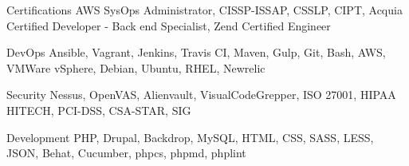 


\begin{cvskills}


\cvskill
{Certifications}
{AWS SysOps Administrator, CISSP-ISSAP, CSSLP, CIPT, Acquia Certified Developer - Back end Specialist, Zend Certified Engineer }

\cvskill
{DevOps}
{Ansible, Vagrant, Jenkins, Travis CI, Maven, Gulp, Git, Bash, AWS, VMWare vSphere, Debian, Ubuntu, RHEL, Newrelic }

\cvskill
{Security}
{Nessus, OpenVAS, Alienvault, VisualCodeGrepper, ISO 27001, HIPAA HITECH, PCI-DSS, CSA-STAR, SIG }

\cvskill
{Development}
{PHP, Drupal, Backdrop, MySQL, HTML, CSS, SASS, LESS, JSON, Behat, Cucumber, phpcs, phpmd, phplint }




\end{cvskills}
